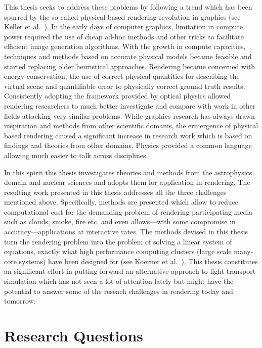 This thesis seeks to address these problems by following a trend which has been spurred by the so called physical based rendering revolution in graphics (see Keller et al.~\cite{Keller15}). In the early days of computer graphics, limitation in compute power required the use of cheap ad-hoc methods and other tricks to facilitate efficient image generation algorithms. With the growth in compute capacities, techniques and methods based on accurate physical models became feasible and started replacing older heuristical approaches. Rendering became concerned with energy conservation, the use of correct physical quantities for describing the virtual scene and quantifiable error to physically correct ground truth results. Consistently adopting the framework provided by optical physics allowed rendering researchers to much better investigate and compare with work in other fields attacking very similar problems. While graphics research has always drawn inspiration and methods from other scientific domanis, the ermergence of physical based rendering caused a significant increase in research work which is based on findings and theories from other domains. Physics provided a common language allowing much easier to talk across disciplines.

In this spirit this thesis investigates theories and methods from the astrophysics domain and nuclear sciences and adopts them for application in rendering. The resulting work presented in this thesis addresses all the three challenges mentioned above. Specifically, methods are presented which allow to reduce computational cost for the demanding problem of rendering participating media such as clouds, smoke, fire etc. and even allows---with some compromise in accuracy---applications at interactive rates. The methods devised in this thesis turn the rendering problem into the problem of solving a linear system of equations, exactly what high performance computing clusters (large scale many-core systems) have been designed for (see Koerner et al.~\cite{Koerner17}). This thesis constitutes an significant effort in putting forward an alternative approach to light transport simulation which has not seen a lot of attention lately but might have the potential to answer some of the reseach challenges in rendering today and tomorrow.


\section{Research Questions}

